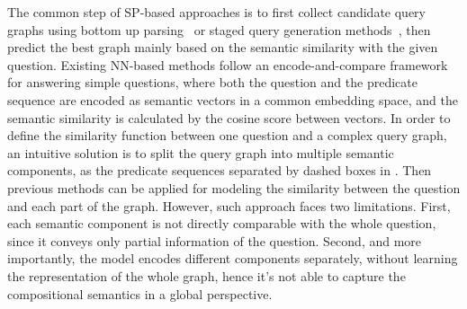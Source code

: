 The common step of SP-based approaches is to first collect candidate query graphs using
bottom up parsing~\cite{berant2013semantic,cai2013large}
or staged query generation methods~\cite{yih2015semantic,bao2016constraint}, 
then predict the best graph mainly based on the semantic similarity with the 
given question. Existing NN-based methods follow an encode-and-compare 
framework for answering simple questions,
where both the question and the predicate sequence are encoded as semantic vectors
in a common embedding space, and the semantic similarity is calculated by the cosine score
between vectors.
In order to define the similarity function between one question and a complex query graph,
an intuitive solution is to split the query graph into multiple semantic components,
as the predicate sequences separated by dashed boxes in .
Then previous methods can be applied for modeling the similarity between the question
and each part of the graph.
However, such approach faces two limitations.
First, each semantic component is not directly comparable with the whole question,
since it conveys only partial information of the question.
Second, and more importantly, the model encodes different components separately,
without learning the representation of the whole graph,
hence it's not able to capture the compositional semantics in a global 
perspective.

